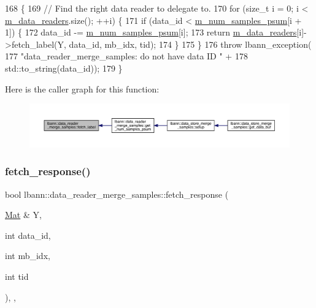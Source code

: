 \begin{DoxyCode}
168                                                      \{
169   \textcolor{comment}{// Find the right data reader to delegate to.}
170   \textcolor{keywordflow}{for} (\textcolor{keywordtype}{size\_t} i = 0; i < \hyperlink{classlbann_1_1generic__compound__data__reader_a9815e94ade5873415fd766e09d956d5b}{m\_data\_readers}.size(); ++i) \{
171     \textcolor{keywordflow}{if} (data\_id < \hyperlink{classlbann_1_1data__reader__merge__samples_afd297d61c11bb6b0d03ce64836bd1300}{m\_num\_samples\_psum}[i + 1]) \{
172       data\_id -= \hyperlink{classlbann_1_1data__reader__merge__samples_afd297d61c11bb6b0d03ce64836bd1300}{m\_num\_samples\_psum}[i];
173       \textcolor{keywordflow}{return} \hyperlink{classlbann_1_1generic__compound__data__reader_a9815e94ade5873415fd766e09d956d5b}{m\_data\_readers}[i]->fetch\_label(Y, data\_id, mb\_idx, tid);
174     \}
175   \}
176   \textcolor{keywordflow}{throw} lbann\_exception(
177     \textcolor{stringliteral}{"data\_reader\_merge\_samples: do not have data ID "} +
178     std::to\_string(data\_id));
179 \}
\end{DoxyCode}
Here is the caller graph for this function\+:\nopagebreak
\begin{figure}[H]
\begin{center}
\leavevmode
\includegraphics[width=350pt]{classlbann_1_1data__reader__merge__samples_a93ce622e95e7ea0438bc78bdda8df44f_icgraph}
\end{center}
\end{figure}
\mbox{\label{classlbann_1_1data__reader__merge__samples_ab39ad6b6e106eb30f58f9eabaf3352ad}} 
\subsubsection{\texorpdfstring{fetch\+\_\+response()}{fetch\_response()}}
{\footnotesize\ttfamily bool lbann\+::data\+\_\+reader\+\_\+merge\+\_\+samples\+::fetch\+\_\+response (\begin{DoxyParamCaption}\item[{\hyperlink{base_8hpp_a68f11fdc31b62516cb310831bbe54d73}{Mat} \&}]{Y,  }\item[{int}]{data\+\_\+id,  }\item[{int}]{mb\+\_\+idx,  }\item[{int}]{tid }\end{DoxyParamCaption})\hspace{0.3cm}{\ttfamily [override]}, {\ttfamily [protected]}, {\ttfamily [virtual]}}

